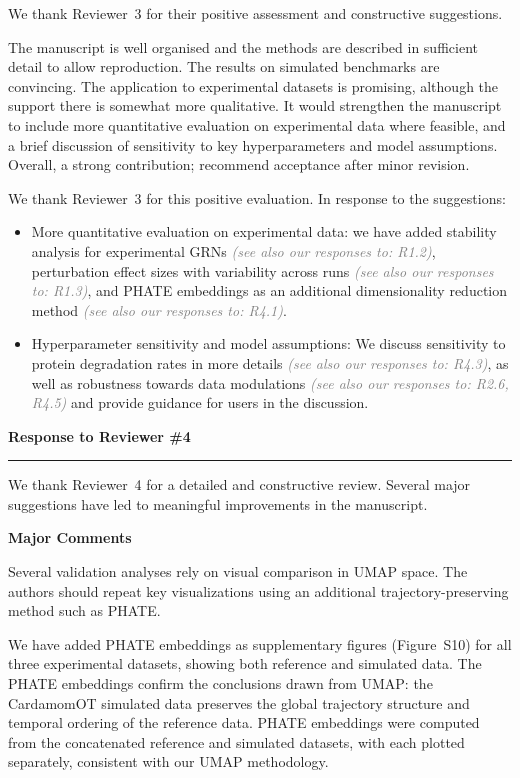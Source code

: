 \documentclass[11pt,a4paper]{article}
\newcounter{revtotal}   %
\newcounter{revlocal}   %
\newcommand{\currentreviewer}{}  %
\newcommand{\newreviewer}[1]{%
  \setcounter{revlocal}{0}%
  \renewcommand{\currentreviewer}{#1}%
}
\newcommand{\revcomment}[2]{%
  \stepcounter{revtotal}%
  \stepcounter{revlocal}%
  \edef\commentlabel{\currentreviewer.\arabic{revlocal}}%
  \begin{tcolorbox}[revstyle,
      title={\commentlabel\ $|$\ #1}]
    #2
  \end{tcolorbox}%
  \edef\lastcommentlabel{\commentlabel}%
}
\newcommand{\response}[1]{%
  \begin{tcolorbox}[respstyle,
      title={Response to \lastcommentlabel}]
    #1
  \end{tcolorbox}%
}
\newcommand{\seealso}[1]{\textit{\textcolor{gray}{(see also our responses to: #1)}}}
\renewcommand{\section}[1]{%
  \vspace{1.2em}%
  {\large\bfseries\color{secpurple} #1}\\[-0.4em]%
  {\color{secpurple}\rule{\linewidth}{0.8pt}}%
  \vspace{0.4em}%
}
\newcommand{\subsect}[1]{%
  \vspace{0.8em}%
  {\normalsize\bfseries\color{revblue} #1}%
  \vspace{0.3em}\par%
}
\begin{document}
\newreviewer{R3}

We thank Reviewer~3 for their positive assessment and constructive suggestions.

\revcomment{General assessment and recommendations}{%
The manuscript is well organised and the methods are described in sufficient detail to allow
reproduction. The results on simulated benchmarks are convincing. The application to
experimental datasets is promising, although the support there is somewhat more qualitative.
It would strengthen the manuscript to include more quantitative evaluation on experimental data
where feasible, and a brief discussion of sensitivity to key hyperparameters and model
assumptions. Overall, a strong contribution; recommend acceptance after minor revision.}
\response{%
We thank Reviewer~3 for this positive evaluation. In response to the suggestions:
\begin{itemize}
  \item More quantitative evaluation on experimental data: we have added stability analysis
        for experimental GRNs \seealso{R1.2}, perturbation effect sizes with variability
        across runs \seealso{R1.3}, and PHATE embeddings as an additional
        dimensionality reduction method \seealso{R4.1}.
  \item Hyperparameter sensitivity and model assumptions: We discuss sensitivity to protein degradation rates in more details \seealso{R4.3}, as well as robustness towards data modulations \seealso{R2.6, R4.5} and provide guidance for users in the discussion.
\end{itemize}}

\section{Response to Reviewer \#4}

\newreviewer{R4}

We thank Reviewer~4 for a detailed and constructive review. Several major suggestions have
led to meaningful improvements in the manuscript.

\subsect{Major Comments}

\revcomment{Robustness of low-dimensional embedding validation}{%
Several validation analyses rely on visual comparison in UMAP space. The authors should
repeat key visualizations using an additional trajectory-preserving method such as PHATE.}
\response{%
We have added PHATE embeddings as supplementary figures (Figure~S10) for all three
experimental datasets, showing both reference and simulated data. The PHATE embeddings
confirm the conclusions drawn from UMAP: the CardamomOT simulated data preserves the
global trajectory structure and temporal ordering of the reference data. PHATE embeddings
were computed from the concatenated reference and simulated datasets, with each plotted
separately, consistent with our UMAP methodology.}
\end{document}
